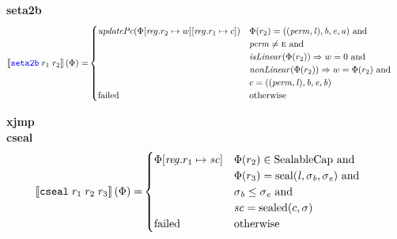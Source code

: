 \documentclass[a4paper]{article}
\newcommand{\sem}[1]{\left\llbracket #1 \right\rrbracket}
\newcommand{\tand}{\text{ and }}
\newcommand{\totherwise}{\text{otherwise }}
\newcommand{\sourcecolor}[1]{\color{blue}}
\newcommand{\src}[1]{{\sourcecolor{} #1}}
\newcommand{\targetcolor}[1]{\color{black}}
\newcommand{\trg}[1]{{\targetcolor{} #1}}
\newcommand{\zinstr}[1]{\texttt{#1}}
\newcommand{\twoinstr}[3]{
  \ifthenelse{\equal{#2#3}{}}
  {\zinstr{#1}}
  {\zinstr{#1} \; #2 \; #3}
}
\newcommand{\threeinstr}[4]{
  \ifthenelse{\equal{#2#3#4}{}}
  {\zinstr{#1}}
  {\zinstr{#1} \; #2 \; #3 \; #4}
}
\newcommand{\ssetatob}[2]{\twoinstr{\src{seta2b}}{#1}{#2}}
\newcommand{\tcseal}[3]{\threeinstr{\trg{cseal}}{#1}{#2}{#3}}
\newcommand{\update}[2]{[#1 \mapsto #2]}
\newcommand{\updReg}[2]{\update{\reg.#1}{#2}}
\newcommand{\shareddom}[1]{\mathrm{#1}}
\newcommand{\SealableCaps}{\shareddom{SealableCap}}
\newcommand{\perm}{\var{perm}}
\newcommand{\lin}{\var{l}}
\newcommand{\seal}[1]{\shareddom{seal}(#1)}
\newcommand{\sealed}[1]{\shareddom{sealed}(#1)}
\newcommand{\failed}{\mathrm{failed}}
\newcommand{\var}[1]{\mathit{#1}}
\newcommand{\reg}{\var{reg}}
\newcommand{\vsc}{\var{sc}}
\newcommand{\baddr}{\var{b}}
\newcommand{\eaddr}{\var{e}}
\newcommand{\aaddr}{\var{a}}
\newcommand{\plainperm}[1]{\textsc{#1}}
\newcommand{\enter}{\plainperm{e}}
\newcommand{\plainfun}[2]{
  \ifthenelse{\equal{#2}{}}
  {\mathit{#1}}
  {\mathit{#1}(#2)}
}
\newcommand{\updPcAddr}[1]{\plainfun{updatePc}{#1}}
\newcommand{\nonLinear}[1]{\plainfun{nonLinear}{#1}}
\newcommand{\isLinear}[1]{\plainfun{isLinear}{#1}}
\begin{document}
\noindent\textbf{seta2b}\\
\begin{align*}
  \sem{\ssetatob{r_1}{r_2}}(\Phi) = & 
                                \begin{cases}
                                  \updPcAddr{\Phi\updReg{r_2}{w}\updReg{r_1}{c}} &
                                    \arraycolsep=0pt
                                    \begin{array}[t]{l}
                                      \Phi(r_2) = ((\perm,\lin),\baddr,\eaddr,\aaddr) \tand \\
                                      \perm \neq \enter \tand \\
                                      \isLinear{\Phi(r_2)} \Rightarrow w = 0 \tand \\
                                      \nonLinear{\Phi(r_2)} \Rightarrow w = \Phi(r_2) \tand \\
                                      c = ((\perm,\lin),\baddr,\eaddr,\baddr)
                                    \end{array} \\
                                    \failed & \totherwise
                                \end{cases}
\end{align*}

\noindent\textbf{xjmp}\\


\noindent\textbf{cseal}\\
\begin{align*}
  \sem{\tcseal{r_1}{r_2}{r_3}}(\Phi) = &
                                  \begin{cases}
                                    \Phi\updReg{r_1}{\vsc} &
                                    \arraycolsep=0pt
                                    \begin{array}[t]{l}
                                      \Phi(r_2) \in \SealableCaps \tand \\
                                      \Phi(r_3) = \seal{\lin, \sigma_\baddr, \sigma_\eaddr} \tand \\
                                      \sigma_\baddr \leq \sigma_\eaddr \tand \\ 
                                      \vsc = \sealed{c,\sigma}
                                    \end{array}
                                    \\
                                    \failed & \totherwise
                                  \end{cases}
\end{align*}
\end{document}
